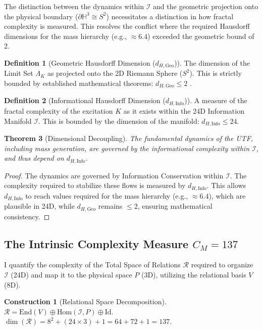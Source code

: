 \documentclass[11pt, a4paper]{article}
\newtheorem{theorem}{Theorem}[section]
\theoremstyle{definition}
\newtheorem{definition}[theorem]{Definition}
\newtheorem{construction}{Construction}
\theoremstyle{definition}
\newcommand{\HH}{\mathbb{H}^3}
\newcommand{\Ical}{\mathcal{I}}
\newcommand{\dHInfo}{d_{H,\mathrm{Info}}} %
\newcommand{\dHGeo}{d_{H,\mathrm{Geo}}} %
\newcommand{\LimitSet}{\Lambda} %
\begin{document}
The distinction between the dynamics within $\Ical$ and the geometric projection onto the physical boundary ($\partial \HH \cong S^2$) necessitates a distinction in how fractal complexity is measured. This resolves the conflict where the required Hausdorff dimensions for the mass hierarchy (e.g., $\approx 6.4$) exceeded the geometric bound of 2.

\begin{definition}[Geometric Hausdorff Dimension ($\dHGeo$)]
The dimension of the Limit Set $\LimitSet_K$ as projected onto the 2D Riemann Sphere ($S^2$). This is strictly bounded by established mathematical theorems: $\dHGeo \leq 2$ \cite{BishopJones1997}.
\end{definition}

\begin{definition}[Informational Hausdorff Dimension ($\dHInfo$)]
A measure of the fractal complexity of the excitation $K$ as it exists within the 24D Information Manifold $\Ical$. This is bounded by the dimension of the manifold: $\dHInfo \leq 24$.
\end{definition}

\begin{theorem}[Dimensional Decoupling]\label{thm:decoupling}
The fundamental dynamics of the UTF, including mass generation, are governed by the informational complexity within $\Ical$, and thus depend on $\dHInfo$.
\end{theorem}
\begin{proof}
The dynamics are governed by Information Conservation within $\Ical$. The complexity required to stabilize these flows is measured by $\dHInfo$. This allows $\dHInfo$ to reach values required for the mass hierarchy (e.g., $\approx 6.4$), which are plausible in 24D, while $\dHGeo$ remains $\leq 2$, ensuring mathematical consistency.
\end{proof}

\subsection{The Intrinsic Complexity Measure \texorpdfstring{$C_M=137$}{C M=137}}

I quantify the complexity of the Total Space of Relations $\mathcal{R}$ required to organize $\Ical$ (24D) and map it to the physical space $P$ (3D), utilizing the relational basis $V$ (8D).

\begin{construction}[Relational Space Decomposition]
$\mathcal{R} = \text{End}(V) \oplus \text{Hom}(\Ical, P) \oplus \text{Id}$.
$\dim(\mathcal{R}) = 8^2 + (24 \times 3) + 1 = 64 + 72 + 1 = 137$.
\end{construction}
\end{document}
